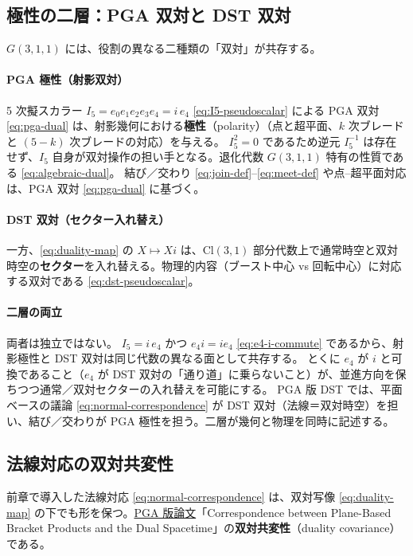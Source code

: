 \documentclass[dvipdfmx,a4paper,oneside]{jsbook}
\numberwithin{equation}{chapter}
\begin{document}
\subsection{極性の二層：PGA 双対と DST 双対}

\(G(3,1,1)\) には、役割の異なる二種類の「双対」が共存する。

\paragraph{PGA 極性（射影双対）}
5 次擬スカラー \(I_5 = e_0 e_1 e_2 e_3 e_4 = i\, e_4\) \eqref{eq:I5-pseudoscalar} による PGA 双対 \eqref{eq:pga-dual} は、射影幾何における\textbf{極性}（polarity）（点と超平面、\(k\) 次ブレードと \((5-k)\) 次ブレードの対応）を与える。
\(I_5^2 = 0\) であるため逆元 \(I_5^{-1}\) は存在せず、\(I_5\) 自身が双対操作の担い手となる。退化代数 \(G(3,1,1)\) 特有の性質である \eqref{eq:algebraic-dual}。
結び／交わり \eqref{eq:join-def}–\eqref{eq:meet-def} や点–超平面対応は、PGA 双対 \eqref{eq:pga-dual} に基づく。

\paragraph{DST 双対（セクター入れ替え）}
一方、\eqref{eq:duality-map} の \(X \mapsto Xi\) は、\(\mathrm{Cl}(3,1)\) 部分代数上で通常時空と双対時空の\textbf{セクター}を入れ替える。物理的内容（ブースト中心 vs 回転中心）に対応する双対である \eqref{eq:dst-pseudoscalar}。

\paragraph{二層の両立}
両者は独立ではない。
\(I_5 = i\, e_4\) かつ \(e_4 i = i e_4\) \eqref{eq:e4-i-commute} であるから、射影極性と DST 双対は同じ代数の異なる面として共存する。
とくに \(e_4\) が \(i\) と可換であること（\(e_4\) が DST 双対の「通り道」に乗らないこと）が、並進方向を保ちつつ通常／双対セクターの入れ替えを可能にする。
PGA 版 DST では、平面ベースの議論 \eqref{eq:normal-correspondence} が DST 双対（法線＝双対時空）を担い、結び／交わりが PGA 極性を担う。二層が幾何と物理を同時に記述する。

\subsection{法線対応の双対共変性}

前章で導入した法線対応 \eqref{eq:normal-correspondence} は、双対写像 \eqref{eq:duality-map} の下でも形を保つ。\hyperref[sec:sister-manuscripts]{PGA 版論文}「Correspondence between Plane-Based Bracket Products and the Dual Spacetime」の\textbf{双対共変性}（duality covariance）である。
\end{document}
